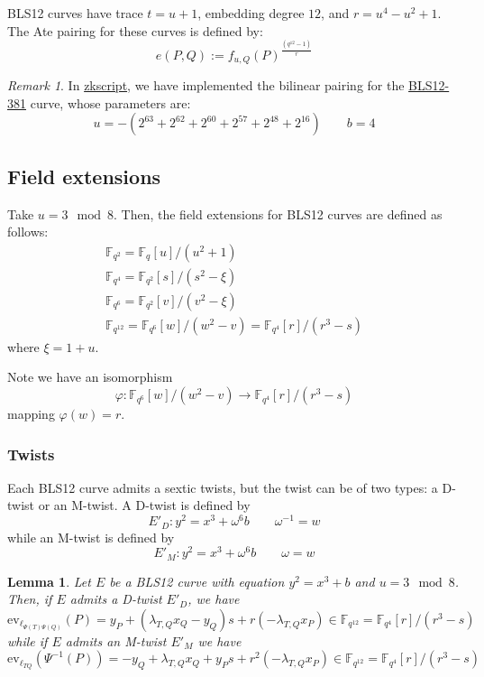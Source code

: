 \documentclass{article}
\newcommand{\ev}{\mathrm{ev}}
\newcommand{\fq}[1]{\mathbb{F}_{q^{#1}}}
\theoremstyle{remark}
\newtheorem{remark}{Remark}[section]
\theoremstyle{plain}
\newtheorem{lemma}{Lemma}[section]
\begin{document}
BLS12 curves have trace $t = u + 1$, embedding degree $12$, and $r = u^4 - u^2 + 1$.
The Ate pairing for these curves is defined by:
\[
    e(P,Q) := f_{u,Q}(P)^{\frac{(q^{12}-1)}{r}}
\]

\begin{remark}
    In \href{https://github.com/nchain-innovation/zkscript_package}{zkscript}, we have implemented the bilinear pairing for the \href{https://electriccoin.co/blog/new-snark-curve/}{BLS12-381} curve, whose parameters are:
    \[
        u = -(2^{63} + 2^{62} + 2^{60} + 2^{57} + 2^{48} + 2^{16}) \quad \quad b = 4
    \]
\end{remark}

\subsection{Field extensions}

Take $u = 3 \mod 8$.
Then, the field extensions for BLS12 curves are defined as follows:
\[
    \renewcommand{\arraystretch}{1.2}
    \begin{array}{l}
        \fq{2} = \fq{}[u] / (u^2 + 1)\\
        \fq{4} = \fq{2}[s] / (s^2 - \xi)\\
        \fq{6} = \fq{2}[v] / (v^2 - \xi)\\
        \fq{12} = \fq{6}[w] / (w^2 - v) = \fq{4}[r] / (r^3 - s)
    \end{array}
\]
where $\xi = 1 + u$.

Note we have an isomorphism
\[
    \varphi \colon \fq{6}[w] / (w^2 - v) \rightarrow \fq{4}[r] / (r^3 - s)
\]
mapping $\varphi(w) = r$.

\subsubsection{Twists}

Each BLS12 curve admits a sextic twists, but the twist can be of two types: a D-twist or an M-twist.
A D-twist is defined by
\[
    E'_D: y^2 = x^3 + \omega^6 b \quad \quad \omega^{-1} = w
\]
while an M-twist is defined by
\[
    E'_M: y^2 = x^3 + \omega^6 b \quad \quad \omega = w
\]

\begin{lemma}
    \label{lem:lineEvalBLS}
    Let $E$ be a BLS12 curve with equation $y^2 = x^3 + b$ and $u = 3 \mod 8$.
    Then, if $E$ admits a D-twist $E'_D$, we have
    \[
        \ev_{\ell_{\Psi(T)\Psi(Q)}}(P) = y_P + (\lambda_{T,Q} x_Q - y_Q) s + r (- \lambda_{T,Q} x_P) \in \fq{12} = \fq{4}[r] / (r^3 - s)
    \]
    while if $E$ admits an M-twist $E'_M$ we have
    \[
        \ev_{\ell_{TQ}}(\Psi^{-1}(P)) = - y_Q + \lambda_{T,Q} x_Q + y_P s + r^2 (-\lambda_{T,Q} x_P) \in \fq{12} = \fq{4}[r] / (r^3 - s)
    \]
\end{lemma}
\end{document}
